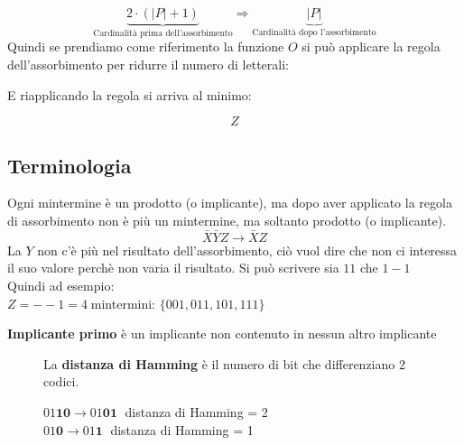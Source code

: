 \documentclass[a4paper]{article}
\theoremstyle{break}
\theoremstyle{break}
\theoremstyle{break}
\theoremstyle{break}
\begin{document}
\[
    \underbrace{2 \cdot (|P|+1)}_{\text{Cardinalità prima dell'assorbimento}} \Rightarrow \underbrace{|P|}_{\text{Cardinalità dopo l'assorbimento}}
\]
Quindi se prendiamo come riferimento la funzione \( O \) si può applicare la
regola dell'assorbimento per ridurre il numero di letterali:
\begin{center}
\end{center}
E riapplicando la regola si arriva al minimo:
\begin{center}
\end{center}
\[
	Z
\]
\subsection{Terminologia}
Ogni mintermine è un prodotto (o implicante), ma dopo aver applicato la regola
di assorbimento non è più un mintermine, ma soltanto prodotto (o implicante).
\[
	\bar{X}\bar{Y}Z \to \bar{X}Z
\]
La \( Y \) non c'è più nel risultato dell'assorbimento, ciò vuol dire che non
ci interessa il suo valore perchè non varia il risultato. Si può scrivere sia
\(
11
\)
che
\(
1-1
\)\\
Quindi ad esempio:\\
\( Z=--1=4\; \)mintermini: \( \{ 001, 011, 101, 111 \} \)
\begin{definition}
	\textbf{Implicante primo} è un implicante non contenuto in nessun altro
	implicante
\end{definition}

\begin{figure}[H]
    \begin{definition}
        La \textbf{distanza di Hamming} è il numero di bit che differenziano 2 codici.
        \begin{center}
            \( 01 \textbf{10} \to 01 \textbf{01}\; \) distanza di Hamming = 2\\
            \( 01 \textbf{0} \to 01 \textbf{1}\; \) distanza di Hamming = 1
        \end{center}
    \end{definition}
\end{figure}
\end{document}
